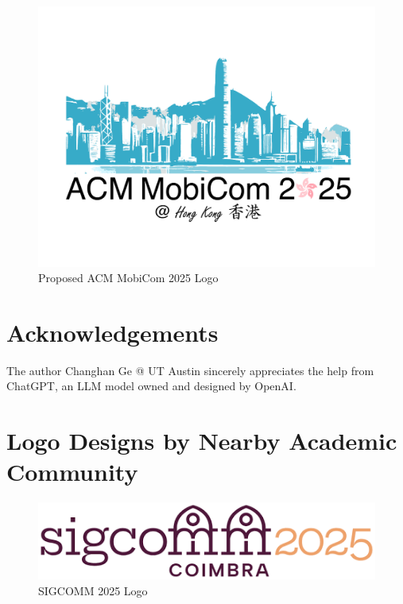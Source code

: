 \documentclass[sigconf, 10pt]{acmart}
\begin{document}
\begin{figure}[h]
	\centering
	\includegraphics[width=\columnwidth, clip=true, trim=2cm 3cm 2cm 3cm]{../logo/mobicom25_logo.pdf}
	\caption{Proposed ACM MobiCom 2025 Logo}
	\label{fig:logo}
\end{figure}


\vspace{-3pt}
\section*{Acknowledgements}
\vspace{-3pt}
The author Changhan Ge @ UT Austin sincerely appreciates the help from ChatGPT, an LLM model owned and designed by OpenAI.

\appendix
\section{Logo Designs by Nearby Academic Community}
\begin{figure}[h]
	\centering
	\includegraphics[width=\columnwidth]{./appendix/sigcomm25-logo.png}
	\caption{SIGCOMM 2025 Logo}
	\label{fig:sigcomm25logo}
\end{figure}
\end{document}
